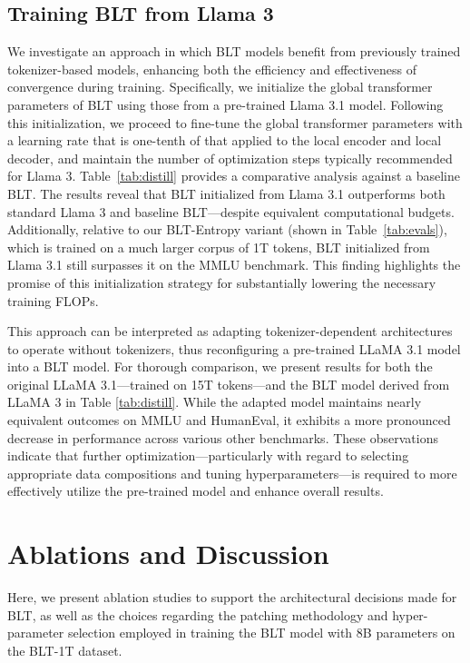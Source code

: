 \subsection{Training {\textsc BLT} from Llama 3}
\label{sec:distillation}
We investigate an approach in which {\textsc BLT} models benefit from previously trained tokenizer-based models, enhancing both the efficiency and effectiveness of convergence during training. Specifically, we initialize the global transformer parameters of {\textsc BLT} using those from a pre-trained Llama 3.1 model. Following this initialization, we proceed to fine-tune the global transformer parameters with a learning rate that is one-tenth of that applied to the local encoder and local decoder, and maintain the number of optimization steps typically recommended for Llama 3. Table~\ref{tab:distill} provides a comparative analysis against a baseline {\textsc BLT}. The results reveal that {\textsc BLT} initialized from Llama 3.1 outperforms both standard Llama 3 and baseline {\textsc BLT}—despite equivalent computational budgets. Additionally, relative to our {\textsc BLT}-Entropy variant (shown in Table~\ref{tab:evals}), which is trained on a much larger corpus of 1T tokens, {\textsc BLT} initialized from Llama 3.1 still surpasses it on the MMLU benchmark. This finding highlights the promise of this initialization strategy for substantially lowering the necessary training FLOPs.

This approach can be interpreted as adapting tokenizer-dependent architectures to operate without tokenizers, thus reconfiguring a pre-trained LLaMA 3.1 model into a {\textsc BLT} model. For thorough comparison, we present results for both the original LLaMA 3.1—trained on 15T tokens—and the {\textsc BLT} model derived from LLaMA 3 in Table \ref{tab:distill}. While the adapted model maintains nearly equivalent outcomes on MMLU and HumanEval, it exhibits a more pronounced decrease in performance across various other benchmarks. These observations indicate that further optimization—particularly with regard to selecting appropriate data compositions and tuning hyperparameters—is required to more effectively utilize the pre-trained model and enhance overall results.

\section{Ablations and Discussion}
\label{section:ablations}
Here, we present ablation studies to support the architectural decisions made for {\textsc BLT}, as well as the choices regarding the patching methodology and hyper-parameter selection employed in training the {\textsc BLT} model with 8B parameters on the {\textsc BLT}-1T dataset.

